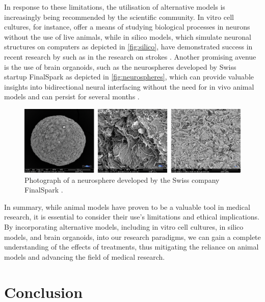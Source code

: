 \documentclass[10pt]{article}
\begin{document}
\begin{sloppypar}
  In response to these limitations, the utilisation of alternative models is increasingly being recommended by the scientific community. In vitro cell cultures, for instance, offer a means of studying biological processes in neurons without the use of live animals, while in silico models, which simulate neuronal structures on computers as depicted in \autoref{fig:silico}, have demonstrated success in recent research by such as in the research on strokes \citep{bing_medical_2020}. Another promising avenue is the use of brain organoids, such as the neurospheres developed by Swiss startup FinalSpark as depicted in \autoref{fig:neurospheres}, which can provide valuable insights into bidirectional neural interfacing without the need for in vivo animal models and can persist for several months \citep{finalspark_artificial_2022}.

  \vspace{10pt} %
  \begin{figure}[ht]
    \centering
    \includegraphics[width=\textwidth]{figures/neurosphere.png}
    \caption[Photographs of a neurosphere developed by the Swiss company FinalSpark]{Photograph of a neurosphere developed by the Swiss company FinalSpark \citep{finalspark_artificial_2022}.}
    \label{fig:neurospheres}
  \end{figure}

  In summary, while animal models have proven to be a valuable tool in medical research, it is essential to consider their use’s limitations and ethical implications. By incorporating alternative models, including in vitro cell cultures, in silico models, and brain organoids, into our research paradigms, we can gain a complete understanding of the effects of treatments, thus mitigating the reliance on animal models and advancing the field of medical research.

  \section{Conclusion}
  \label{sec:conclusion}


\end{sloppypar}
\end{document}
